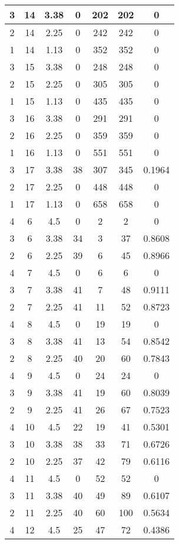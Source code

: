 \documentclass[letterpaper, 12pt]{article}
\begin{document}
\begin{longtable}{|c|c|c|c|c|c|c|}
\hline
3 & 14 & 3.38 & 0 & 202 & 202 & 0 \\
\hline
2 & 14 & 2.25 & 0 & 242 & 242 & 0 \\
\hline
1 & 14 & 1.13 & 0 & 352 & 352 & 0 \\
\hline
3 & 15 & 3.38 & 0 & 248 & 248 & 0 \\
\hline
2 & 15 & 2.25 & 0 & 305 & 305 & 0 \\
\hline
1 & 15 & 1.13 & 0 & 435 & 435 & 0 \\
\hline
3 & 16 & 3.38 & 0 & 291 & 291 & 0 \\
\hline
2 & 16 & 2.25 & 0 & 359 & 359 & 0 \\
\hline
1 & 16 & 1.13 & 0 & 551 & 551 & 0 \\
\hline
3 & 17 & 3.38 & 38 & 307 & 345 & 0.1964 \\
\hline
2 & 17 & 2.25 & 0 & 448 & 448 & 0 \\
\hline
1 & 17 & 1.13 & 0 & 658 & 658 & 0 \\
\hline
4 & 6 & 4.5 & 0 & 2 & 2 & 0 \\
\hline
3 & 6 & 3.38 & 34 & 3 & 37 & 0.8608 \\
\hline
2 & 6 & 2.25 & 39 & 6 & 45 & 0.8966 \\
\hline
4 & 7 & 4.5 & 0 & 6 & 6 & 0 \\
\hline
3 & 7 & 3.38 & 41 & 7 & 48 & 0.9111 \\
\hline
2 & 7 & 2.25 & 41 & 11 & 52 & 0.8723 \\
\hline
4 & 8 & 4.5 & 0 & 19 & 19 & 0 \\
\hline
3 & 8 & 3.38 & 41 & 13 & 54 & 0.8542 \\
\hline
2 & 8 & 2.25 & 40 & 20 & 60 & 0.7843 \\
\hline
4 & 9 & 4.5 & 0 & 24 & 24 & 0 \\
\hline
3 & 9 & 3.38 & 41 & 19 & 60 & 0.8039 \\
\hline
2 & 9 & 2.25 & 41 & 26 & 67 & 0.7523 \\
\hline
4 & 10 & 4.5 & 22 & 19 & 41 & 0.5301 \\
\hline
3 & 10 & 3.38 & 38 & 33 & 71 & 0.6726 \\
\hline
2 & 10 & 2.25 & 37 & 42 & 79 & 0.6116 \\
\hline
4 & 11 & 4.5 & 0 & 52 & 52 & 0 \\
\hline
3 & 11 & 3.38 & 40 & 49 & 89 & 0.6107 \\
\hline
2 & 11 & 2.25 & 40 & 60 & 100 & 0.5634 \\
\hline
4 & 12 & 4.5 & 25 & 47 & 72 & 0.4386 \\

\end{longtable}
\end{document}
